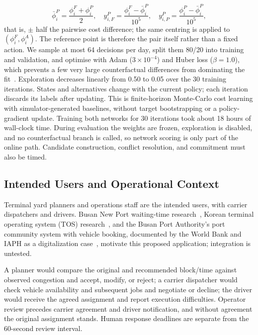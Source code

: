 \documentclass[a4paper]{llncs}
\begin{document}
\begin{equation}
\bar\phi_i^P=\frac{\phi_i^F+\phi_i^P}{2},\quad
y_{i,F}^P=\frac{\phi_i^F-\bar\phi_i^P}{10^5},\quad
y_{i,P}^P=\frac{\phi_i^P-\bar\phi_i^P}{10^5},
\end{equation}
that is, $\pm$ half the pairwise cost difference; the same centring is
applied to $(\phi_i^F,\phi_i^A)$. The reference point is therefore the
pair itself rather than a fixed action.
We sample at most 64 decisions per day, split them 80/20 into training
and validation, and optimise with Adam ($3\times10^{-4}$) and Huber loss
($\beta=1.0$), which prevents a few very large counterfactual
differences from dominating the fit~\cite{refhuber}. Exploration
decreases linearly from 0.50 to 0.05 over the 30 training iterations.
States and alternatives change with the current policy; each iteration
discards its labels after updating. This is finite-horizon Monte-Carlo
cost learning with simulator-generated baselines, without target
bootstrapping or a policy-gradient update.
Training both networks for 30 iterations took about 18 hours
of wall-clock time. During evaluation the weights are frozen,
exploration is disabled, and no counterfactual branch is called, so
network scoring is only part of the online path. Candidate construction,
conflict resolution, and commitment must also be timed.

\subsection{Intended Users and Operational Context}
\label{sec:user-context}
Terminal yard planners and operations staff are the intended users,
with carrier dispatchers and drivers. Busan New Port waiting-time
research~\cite{refbusanwait}, Korean terminal operating system (TOS)
research~\cite{reftos}, and the Busan Port Authority's port community
system with vehicle booking, documented by the World Bank and IAPH as a
digitalization case~\cite{refwbiaph}, motivate this proposed application;
integration is untested.

A planner would compare the original and recommended block/time against
observed congestion and accept, modify, or reject; a carrier dispatcher
would check vehicle availability and subsequent jobs and negotiate or
decline; the driver would receive the agreed assignment and report
execution difficulties. Operator review precedes carrier agreement and
driver notification, and without agreement the original assignment
stands. Human response deadlines are separate from the 60-second review
interval.
\end{document}
